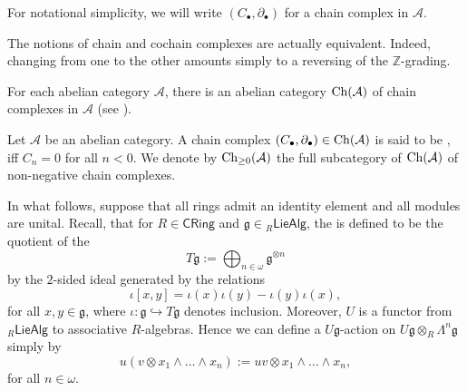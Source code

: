 \begin{remark}
	For notational simplicity, we will write $(C_\bullet,\partial_\bullet)$ for a chain complex in $\mathcal{A}$.
\end{remark}

\begin{remark}
	The notions of chain and cochain complexes are actually equivalent. Indeed, changing from one to the other amounts simply to a reversing of the $\mathbb{Z}$-grading.
\end{remark}

\begin{remark}
	For each abelian category $\mathcal{A}$, there is an abelian category $\operatorname{Ch}(\mathcal{A})$ of chain complexes in $\mathcal{A}$ (see \cite[7]{weibel:homological_algebra:1994}).
\end{remark}

\begin{definition}
	Let $\mathcal{A}$ be an abelian category. A chain complex $(C_\bullet,\partial_\bullet) \in \operatorname{Ch}(\mathcal{A})$ is said to be , iff $C_n = 0$ for all $n < 0$. We denote by $\operatorname{Ch}_{\geq 0}(\mathcal{A})$ the full subcategory of $\operatorname{Ch}(\mathcal{A})$ of non-negative chain complexes.
\end{definition}

In what follows, suppose that all rings admit an identity element and all modules are unital. Recall, that for $R \in \mathsf{CRing}$ and $\mathfrak{g} \in {_{R}\mathsf{LieAlg}}$, the  is defined to be the quotient of the 
\begin{equation*}
	T\mathfrak{g} := \bigoplus_{n \in \omega} \mathfrak{g}^{\otimes n}
\end{equation*}
\noindent by the $2$-sided ideal generated by the relations
\begin{equation*}
	\iota[x,y] = \iota(x)\iota(y) - \iota(y)\iota(x),
\end{equation*}
\noindent for all $x,y \in \mathfrak{g}$, where $\iota : \mathfrak{g} \hookrightarrow T\mathfrak{g}$ denotes inclusion. Moreover, $U$ is a functor from $_{R}\mathsf{LieAlg}$ to associative $R$-algebras. Hence we can define a $U\mathfrak{g}$-action on $U\mathfrak{g} \otimes_R \Lambda^n \mathfrak{g}$ simply by
\begin{equation*}
	u(v \otimes x_1 \wedge \dots \wedge x_n) := uv \otimes x_1 \wedge \dots \wedge x_n,
\end{equation*}
\noindent for all $n \in \omega$.

